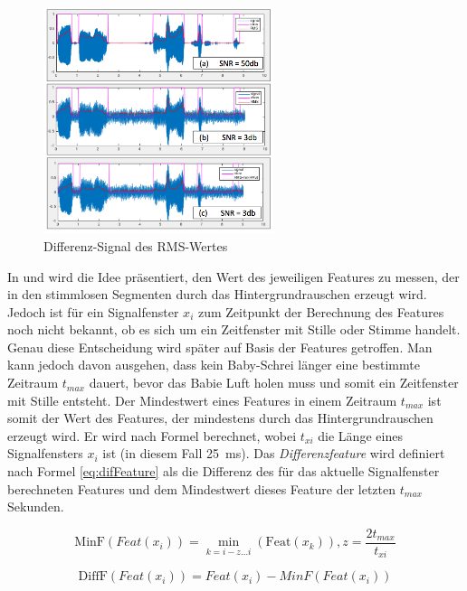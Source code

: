\begin{figure}[h]
	\centering
	\includegraphics[width=0.6\textwidth]{bilder/min-signal.png}
	\caption{Differenz-Signal des RMS-Wertes}
	\label{img:min-signal}
\end{figure}

In \cite{vad_Easy} und \cite{vad_entropy} wird die Idee präsentiert, den Wert des jeweiligen Features zu messen, der in den stimmlosen Segmenten durch das Hintergrundrauschen erzeugt wird. Jedoch ist für ein Signalfenster $x_i$ zum Zeitpunkt der Berechnung des Features noch nicht bekannt, ob es sich um ein Zeitfenster mit Stille oder Stimme handelt. Genau diese Entscheidung wird später auf Basis der Features getroffen. Man kann jedoch davon ausgehen, dass kein Baby-Schrei länger eine bestimmte Zeitraum $t_{max}$ dauert, bevor das Babie Luft holen muss und somit ein Zeitfenster mit Stille entsteht. Der Mindestwert eines Features in einem Zeitraum  $t_{max}$ ist somit der Wert des Features, der mindestens durch das Hintergrundrauschen erzeugt wird. Er wird nach Formel \label{ref:minFeat} berechnet, wobei $t_{xi}$ die Länge eines Signalfensters $x_i$ ist (in diesem Fall \SI{25}{\milli\second}). Das \emph{Differenzfeature} wird definiert nach Formel \ref{eq:difFeature} als die Differenz des für das aktuelle Signalfenster berechneten Features und dem Mindestwert dieses Feature der letzten $t_{max}$ Sekunden.

\begin{equation}
\text{MinF}(Feat(x_i)) = \min_{k=i-z...i}( \text{Feat}(x_k)), z = \frac{2 t_{max}}{t_{xi}}
\label{eq:minFeat}
\end{equation}

\begin{equation}
\text{DiffF}(Feat(x_i)) = Feat(x_i) - MinF(Feat(x_i))
\label{eq:difFeature}
\end{equation}

